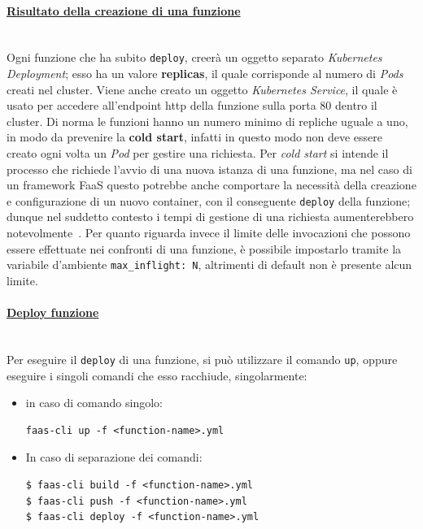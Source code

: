 \documentclass[12pt,a4paper,openany,twoside]{book}
\begin{document}
\paragraph{\underline{Risultato della creazione di una funzione}} ~\\
Ogni funzione che ha subito \texttt{deploy}, creerà un oggetto separato \textit{Kubernetes Deployment}; esso ha un valore \textbf{replicas}, il quale corrisponde al numero di \textit{Pods} creati nel cluster. Viene anche creato un oggetto \textit{Kubernetes Service}, il quale è usato per accedere all'endpoint \ac{http} della funzione sulla porta 80 dentro il cluster.
Di norma le funzioni hanno un numero minimo di repliche uguale a uno, in modo da prevenire la \textbf{cold start}, infatti in questo modo non deve essere creato ogni volta un \textit{Pod} per gestire una richiesta. Per \textit{cold start} si intende il processo che richiede l'avvio di una nuova istanza di una funzione, ma nel caso di un framework \ac{FaaS} questo potrebbe anche comportare la necessità della creazione e configurazione di un nuovo container, con il conseguente \texttt{deploy} della funzione; dunque nel suddetto contesto i tempi di gestione di una richiesta aumenterebbero notevolmente~\cite{216063}.
Per quanto riguarda invece il limite delle invocazioni che possono essere effettuate nei confronti di una funzione, è possibile impostarlo tramite la variabile d'ambiente \texttt{max\_inflight: N}, altrimenti di default non è presente alcun limite.

\paragraph{\underline{Deploy funzione}} ~\\
Per eseguire il \texttt{deploy} di una funzione, si può utilizzare il comando \texttt{up}, oppure eseguire i singoli comandi che esso racchiude, singolarmente:
\begin{itemize}
    \item in caso di comando singolo: \begin{lstlisting}
faas-cli up -f <function-name>.yml\end{lstlisting}
    \item In caso di separazione dei comandi: \begin{lstlisting}
$ faas-cli build -f <function-name>.yml
$ faas-cli push -f <function-name>.yml
$ faas-cli deploy -f <function-name>.yml\end{lstlisting}
\end{itemize}
\end{document}
